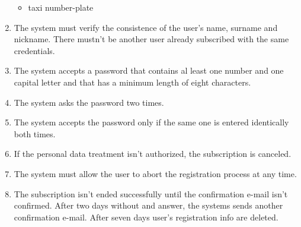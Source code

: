 \begin{enumerate}
\begin{itemize}
        \item taxi number-plate
    \end{itemize}
    \item The system must verify the consistence of the user's name, surname and nickname. There mustn't be another user already subscribed with the same credentials.
    \item The system accepts a password that contains al least one number and one capital letter and that has a minimum length of eight characters.
    \item The system asks the password two times.
    \item The system accepts the password only if the same one is entered identically both times.
    \item If the personal data treatment isn't authorized, the subscription is canceled.
    \item The system must allow the user to abort the registration process at any time.
    \item The subscription isn't ended successfully until the confirmation e-mail isn't confirmed. After two days without and answer, the systems sends another confirmation e-mail. After seven days user's registration info are deleted.
\end{enumerate}

